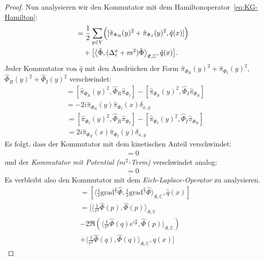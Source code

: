 \documentclass[11pt,a4paper,leqno]{report}
\numberwithin{equation}{chapter}
\begin{document}
\begin{proof}
	\noindent
	Nun analysieren wir den Kommutator mit dem Hamiltonoperator~\eqref{eq:KG-Hamilton}:
	\begin{align*}
		[\hat{H}_{\mathrm{KG}}, \hat{q}(x)] &= \frac{1}{2}\sum_{y\in V}\Bigl([\hat{\pi}_{\Phi_R}(y)^2 + \hat{\pi}_{\Phi_I}(y)^2, \hat{q}(x)]\Bigr) \\
		&\quad + \bigl[\bigl\langle \hat{\Phi}, (\Delta_r^{a} + m^2)\hat{\Phi}\bigr\rangle_{\mathfrak{E},\mathbb{C}}, \hat{q}(x)\bigr].
	\end{align*}
	Jeder Kommutator von $\hat{q}$ mit den Ausdr\"ucken der Form $\hat{\pi}_{\Phi_R}(y)^2 + \hat{\pi}_{\Phi_I}(y)^2$, $\hat{\Phi}_R(y)^2 + \hat{\Phi}_I(y)^2$ verschwindet:
	\begin{align*}
		[\hat{\pi}_{\Phi_R}(y)^2, \hat{q}(x)] &= [\hat{\pi}_{\Phi_R}(y)^2, \hat{\Phi}_R\hat{\pi}_{\Phi_I}]-[\hat{\pi}_{\Phi_R}(y)^2,\hat{\Phi}_I\hat{\pi}_{\Phi_R}]\\
		&= -2i\hat{\pi}_{\Phi_R}(y)\hat{\pi}_{\Phi_I}(x)\delta_{x,y}
	\end{align*}
	\begin{align*}
	[\hat{\pi}_{\Phi_I}(y)^2, \hat{q}(x)] &= [\hat{\pi}_{\Phi_I}(y)^2, \hat{\Phi}_R\hat{\pi}_{\Phi_I}]-[\hat{\pi}_{\Phi_I}(y)^2,\hat{\Phi}_I\hat{\pi}_{\Phi_R}]\\
	&= 2i\hat{\pi}_{\Phi_R}(x)\hat{\pi}_{\Phi_I}(y)\delta_{x,y}
\end{align*}
\noindent
	Es folgt, dass der Kommutator mit dem kinetischen Anteil verschwindet: 
\begin{align*}[\hat{T}, \hat{q}(x)] = 0\end{align*}
    und der \textit{Kommutator mit Potential ($m^2$-Term)} verschwindet analog: \begin{align*}[\langle\hat{\Phi},\hat{\Phi}\rangle_{\mathfrak{E},\mathbb{C}}, \hat{q}(x)] = 0\end{align*}
	Es verbleibt also den Kommutator mit dem \textit{Eich-Laplace-Operator} zu analysieren.
	\begin{align*}
		[\langle \hat{\Phi}, \Delta^{a}_r\hat{\Phi}\rangle_{\mathfrak{E},\mathbb{C}},\hat{q}(x)]&=
		[\langle \frac{1}{r}\text{grad}^{\frac{a}{r}}\hat{\Phi}, \frac{1}{r}\text{grad}^{\frac{a}{r}}\hat{\Phi}\rangle_{\mathfrak{K},\mathbb{C}},\hat{q}(x)]\\&=
		[\langle \frac{1}{r^2} \hat{\Phi}(p), \hat{\Phi}(p)\rangle_{\mathfrak{K},\mathbb{C}} \\&- 2\Re(\langle \frac{1}{r^2}\hat{\Phi}(q)e^{i\frac{a}{r}},\hat{\Phi}(p) \rangle_{\mathfrak{K},\mathbb{C}}) \\&+ \langle \frac{1}{r^2} \hat{\Phi}(q), \hat{\Phi}(q) \rangle_{\mathfrak{K},\mathbb{C}},\hat{q}(x)]

\end{align*}
\end{proof}
\end{document}
